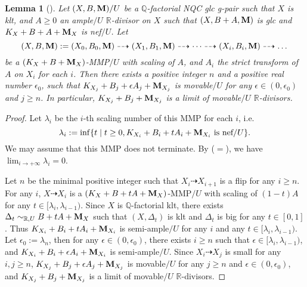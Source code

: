 \documentclass[11pt]{amsart}
\numberwithin{equation}{section}
\newcommand{\Mm}{{\bf{M}}}
\newcommand{\Qq}{\mathbb{Q}}
\newcommand{\Rr}{\mathbb{R}}
\newtheorem{lem}[thm]{Lemma}
\theoremstyle{definition}
\theoremstyle{definition}
\theoremstyle{definition}
\begin{document}
\begin{lem}[{\cite[Version 2, Lemma 2.37]{HL21}}]\label{lem: limit movable r divisors gpairs}
Let $(X,B,\Mm)/U$ be a $\Qq$-factorial NQC glc g-pair such that $X$ is klt, and $A\geq 0$ an ample$/U$ $\Rr$-divisor on $X$ such that $(X,B+A,\Mm)$ is glc and $K_X+B+A+\Mm_X$ is nef$/U$. Let $$(X,B,\Mm):=(X_0,B_0,\Mm)\dashrightarrow (X_1,B_1,\Mm)\dashrightarrow\dots\dashrightarrow (X_i,B_i,\Mm)\dashrightarrow\dots$$
be a $(K_X+B+\Mm_X)$-MMP$/U$ with scaling of $A$, and $A_i$ the strict transform of $A$ on $X_i$ for each $i$. Then there exists a positive integer $n$ and a positive real number $\epsilon_0$, such that $K_{X_j}+B_j+\epsilon A_j+\Mm_{X_j}$ is movable$/U$ for any $\epsilon\in (0,\epsilon_0)$ and $j\geq n$. In particular, $K_{X_j}+B_j+\Mm_{X_j}$ is a limit of movable$/U$ $\Rr$-divisors.
\end{lem}
\begin{proof}
Let $\lambda_i$ be the $i$-th scaling number of this MMP for each $i$, i.e.
$$\lambda_i:=\inf\{t\mid t\geq 0, K_{X_i}+B_i+tA_i+\Mm_{X_i}\text{ is nef/}U\}.$$
We may assume that this MMP does not terminate. By \cite[Theorem 2.8]{HL21} ($=$\cite[Version 3,Theorem 2.24]{HL21}), we have $\lim_{i\rightarrow+\infty}\lambda_i=0$.

Let $n$ be the minimal positive integer such that $X_{i}\dashrightarrow X_{i+1}$ is a flip for any $i\geq n$. For any $i$, $X\dashrightarrow X_{i}$ is a $(K_X+B+tA+\Mm_X)$-MMP$/U$ with scaling of $(1-t)A$ for any $t\in [\lambda_i,\lambda_{i-1})$. Since $X$ is $\Qq$-factorial klt, there exists $\Delta_t\sim_{\Rr,U}B+tA+\Mm_X$ such that $(X,\Delta_t)$ is klt and $\Delta_t$ is big for any $t\in [0,1]$. Thus $K_{X_i}+B_i+tA_i+\Mm_{X_i}$ is semi-ample$/U$ for any $i$ and any $t\in [\lambda_i,\lambda_{i-1})$. Let $\epsilon_0:=\lambda_n$, then for any $\epsilon\in (0,\epsilon_0)$, there exists $i\geq n$ such that $\epsilon\in [\lambda_i,\lambda_{i-1})$, and $K_{X_i}+B_i+\epsilon A_i+\Mm_{X_i}$ is semi-ample$/U$. Since $X_i\dashrightarrow X_j$ is small for any $i,j\geq n$, $K_{X_j}+B_j+\epsilon A_j+\Mm_{X_j}$ is movable$/U$ for any $j\geq n$ and $\epsilon\in (0,\epsilon_0)$, and $K_{X_j}+B_j+\Mm_{X_j}$ is a limit of movable$/U$ $\Rr$-divisors.
\end{proof}
\end{document}
